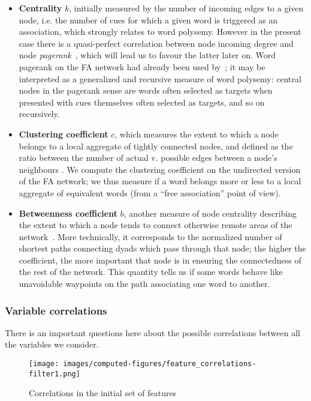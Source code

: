 \begin{itemize}
    \item \textbf{Centrality} $k$, initially measured by the number of incoming edges to a given node, i.e. the number of cues for which a given word is triggered as an association, which strongly relates to word polysemy.
    However in the present case there is a quasi-perfect correlation between node incoming degree and node \emph{pagerank}~\citep{Page99}, which will lead us to favour the latter later on. Word pagerank on the FA network had already been used by~\citet{Griffiths07}; it may be interpreted as a generalized and recursive measure of word polysemy: central nodes in the pagerank sense are words often selected as targets when presented with cues themselves often selected as targets, and so on recursively.
    \item \textbf{Clustering coefficient} $c$, which measures the extent to which a node belongs to a local aggregate of tightly connected nodes, and defined as the ratio between the number of actual v. possible edges between a node's neighbours \cite{watt-coll}.
    We compute the clustering coefficient on the undirected version of the FA network; we thus measure if a word belongs more or less to a local aggregate of equivalent words (from a ``free association'' point of view).
    \item \textbf{Betweenness coefficient} $b$, another measure of node centrality describing the extent to which a node tends to connect otherwise remote areas of the network~\citep{free:set}.
    More technically, it corresponds to the normalized number of shortest paths connecting dyads which pass through that node; the higher the coefficient, the more important that node is in ensuring the connectedness of the rest of the network.
    This quantity tells us if some words behave like unavoidable waypoints on the path associating one word to another.
\end{itemize}

\subsubsection{Variable correlations}

There is an important questions here about the possible correlations between all the variables we consider.

\begin{figure}[!th]
    \centering
    \texttt{[image: images/computed-figures/feature\_correlations-filter1.png]}
    \caption{Correlations in the initial set of features }
    \label{fig:feature-corrs-initial}
\end{figure}

